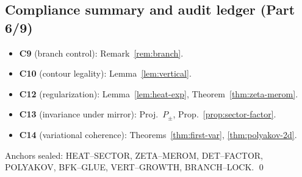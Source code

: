 
\subsection{Compliance summary and audit ledger (Part 6/9)}
\label{subsec:ch6-part6-compliance} \relax \hspace{0pt}
\begin{remark}
\label{rem:part6-compliance}
\begin{itemize}[leftmargin=7mm]
  \item \textbf{C9} (branch control): Remark~\ref{rem:branch}.
  \item \textbf{C10} (contour legality): Lemma~\ref{lem:vertical}.
  \item \textbf{C12} (regularization): Lemma~\ref{lem:heat-exp}, Theorem~\ref{thm:zeta-merom}.
  \item \textbf{C13} (invariance under mirror): Proj.\ $P_\pm$, Prop.~\ref{prop:sector-factor}.
  \item \textbf{C14} (variational coherence): Theorems~\ref{thm:first-var}, \ref{thm:polyakov-2d}.
\end{itemize}
Anchors sealed:
\textsf{HEAT–SECTOR}, \textsf{ZETA–MEROM}, \textsf{DET–FACTOR},
\textsf{POLYAKOV}, \textsf{BFK–GLUE}, \textsf{VERT–GROWTH}, \textsf{BRANCH–LOCK}. \qed
{} %
\end{remark}


